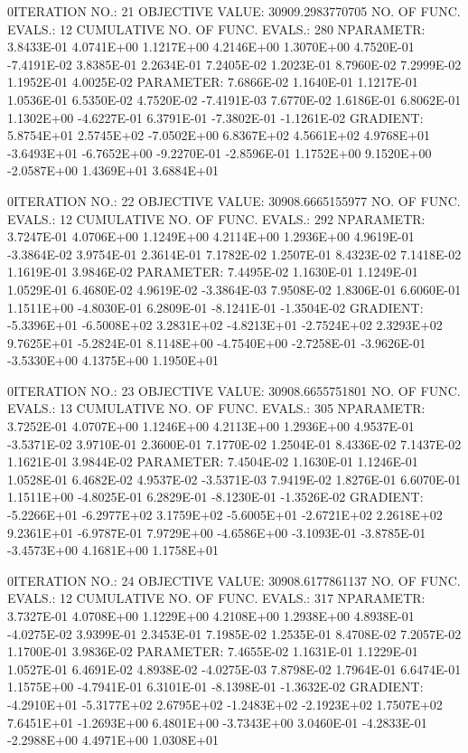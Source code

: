 \documentclass[
  letterpaper,
  toc=chapterentrywithdots,
  listof=totoc,
  11pt,
  headings=small,
  usegeometry]{scrreprt}
\begin{document}
\begin{nonmemlisting}
0ITERATION NO.:   21    OBJECTIVE VALUE:   30909.2983770705        NO. OF FUNC. EVALS.:  12
 CUMULATIVE NO. OF FUNC. EVALS.:      280
 NPARAMETR:  3.8433E-01  4.0741E+00  1.1217E+00  4.2146E+00  1.3070E+00  4.7520E-01 -7.4191E-02  3.8385E-01  2.2634E-01  7.2405E-02
             1.2023E-01  8.7960E-02  7.2999E-02  1.1952E-01  4.0025E-02
 PARAMETER:  7.6866E-02  1.1640E-01  1.1217E-01  1.0536E-01  6.5350E-02  4.7520E-02 -7.4191E-03  7.6770E-02  1.6186E-01  6.8062E-01
             1.1302E+00 -4.6227E-01  6.3791E-01 -7.3802E-01 -1.1261E-02
 GRADIENT:   5.8754E+01  2.5745E+02 -7.0502E+00  6.8367E+02  4.5661E+02  4.9768E+01 -3.6493E+01 -6.7652E+00 -9.2270E-01 -2.8596E-01
             1.1752E+00  9.1520E+00 -2.0587E+00  1.4369E+01  3.6884E+01

0ITERATION NO.:   22    OBJECTIVE VALUE:   30908.6665155977        NO. OF FUNC. EVALS.:  12
 CUMULATIVE NO. OF FUNC. EVALS.:      292
 NPARAMETR:  3.7247E-01  4.0706E+00  1.1249E+00  4.2114E+00  1.2936E+00  4.9619E-01 -3.3864E-02  3.9754E-01  2.3614E-01  7.1782E-02
             1.2507E-01  8.4323E-02  7.1418E-02  1.1619E-01  3.9846E-02
 PARAMETER:  7.4495E-02  1.1630E-01  1.1249E-01  1.0529E-01  6.4680E-02  4.9619E-02 -3.3864E-03  7.9508E-02  1.8306E-01  6.6060E-01
             1.1511E+00 -4.8030E-01  6.2809E-01 -8.1241E-01 -1.3504E-02
 GRADIENT:  -5.3396E+01 -6.5008E+02  3.2831E+02 -4.8213E+01 -2.7524E+02  2.3293E+02  9.7625E+01 -5.2824E-01  8.1148E+00 -4.7540E+00
            -2.7258E-01 -3.9626E-01 -3.5330E+00  4.1375E+00  1.1950E+01

0ITERATION NO.:   23    OBJECTIVE VALUE:   30908.6655751801        NO. OF FUNC. EVALS.:  13
 CUMULATIVE NO. OF FUNC. EVALS.:      305
 NPARAMETR:  3.7252E-01  4.0707E+00  1.1246E+00  4.2113E+00  1.2936E+00  4.9537E-01 -3.5371E-02  3.9710E-01  2.3600E-01  7.1770E-02
             1.2504E-01  8.4336E-02  7.1437E-02  1.1621E-01  3.9844E-02
 PARAMETER:  7.4504E-02  1.1630E-01  1.1246E-01  1.0528E-01  6.4682E-02  4.9537E-02 -3.5371E-03  7.9419E-02  1.8276E-01  6.6070E-01
             1.1511E+00 -4.8025E-01  6.2829E-01 -8.1230E-01 -1.3526E-02
 GRADIENT:  -5.2266E+01 -6.2977E+02  3.1759E+02 -5.6005E+01 -2.6721E+02  2.2618E+02  9.2361E+01 -6.9787E-01  7.9729E+00 -4.6586E+00
            -3.1093E-01 -3.8785E-01 -3.4573E+00  4.1681E+00  1.1758E+01

0ITERATION NO.:   24    OBJECTIVE VALUE:   30908.6177861137        NO. OF FUNC. EVALS.:  12
 CUMULATIVE NO. OF FUNC. EVALS.:      317
 NPARAMETR:  3.7327E-01  4.0708E+00  1.1229E+00  4.2108E+00  1.2938E+00  4.8938E-01 -4.0275E-02  3.9399E-01  2.3453E-01  7.1985E-02
             1.2535E-01  8.4708E-02  7.2057E-02  1.1700E-01  3.9836E-02
 PARAMETER:  7.4655E-02  1.1631E-01  1.1229E-01  1.0527E-01  6.4691E-02  4.8938E-02 -4.0275E-03  7.8798E-02  1.7964E-01  6.6474E-01
             1.1575E+00 -4.7941E-01  6.3101E-01 -8.1398E-01 -1.3632E-02
 GRADIENT:  -4.2910E+01 -5.3177E+02  2.6795E+02 -1.2483E+02 -2.1923E+02  1.7507E+02  7.6451E+01 -1.2693E+00  6.4801E+00 -3.7343E+00
             3.0460E-01 -4.2833E-01 -2.2988E+00  4.4971E+00  1.0308E+01


\end{nonmemlisting}
\end{document}
